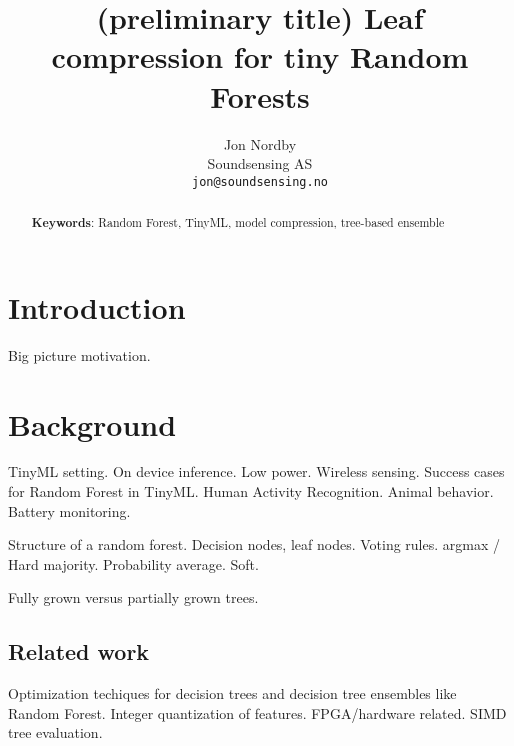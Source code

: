 \documentclass{article}
\begin{document}
\title{(preliminary title) Leaf compression for tiny Random Forests}

\author{
    Jon Nordby \\
	Soundsensing AS \\
	\texttt{jon@soundsensing.no} \\	
}

\date{}

\maketitle
\renewcommand{\abstractname}{\vspace{-\baselineskip}} %

\begin{abstract}	\noindent

\noindent \textbf{Keywords}: Random Forest, TinyML, model compression, tree-based ensemble

\end{abstract}


\section{Introduction}

Big picture motivation.

\noindent

\newpage
\section{Background}

TinyML setting. On device inference. Low power. Wireless sensing.
Success cases for Random Forest in TinyML.
Human Activity Recognition. \cite{elsts_are_2021}
Animal behavior. \cite{tatler_high_2018} \cite{kleanthous_feature_2020} \cite{tran_iot-based_2022}
Battery monitoring. \cite{mawonou_state--health_2021}

Structure of a random forest.
Decision nodes, leaf nodes.
Voting rules. argmax / Hard majority.
Probability average. Soft.

Fully grown versus partially grown trees.

\subsection{Related work}

Optimization techiques for decision trees and decision tree ensembles like Random Forest.
Integer quantization of features.
FPGA/hardware related.
SIMD tree evaluation.
\end{document}
